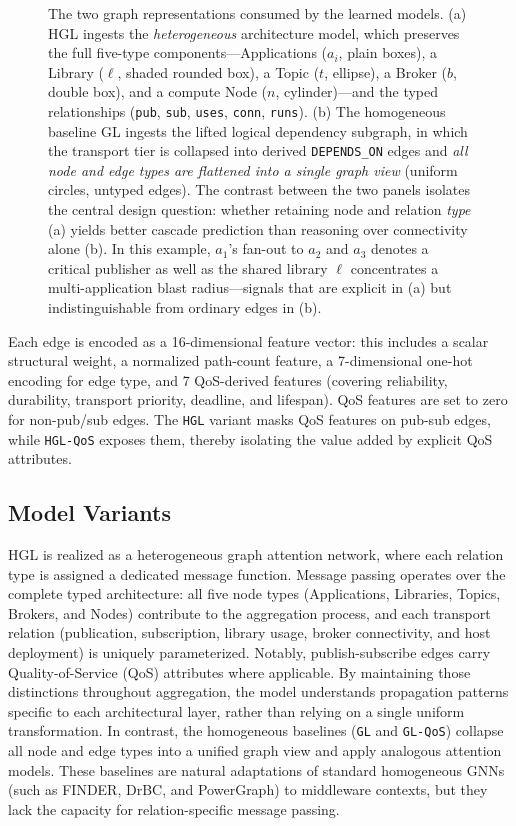 \documentclass[sigconf,9pt,anonymous]{acmart}
\begin{document}
\begin{figure}[t]
\caption{The two graph representations consumed by the learned models. (a) HGL ingests the \emph{heterogeneous} architecture model, which preserves the full five-type components---Applications ($a_i$, plain boxes), a Library ($\ell$, shaded rounded box), a Topic ($t$, ellipse), a Broker ($b$, double box), and a compute Node ($n$, cylinder)---and the typed relationships (\texttt{pub}, \texttt{sub}, \texttt{uses}, \texttt{conn}, \texttt{runs}). (b) The homogeneous baseline GL ingests the lifted logical dependency subgraph, in which the transport tier is collapsed into derived \texttt{DEPENDS\_ON} edges and \emph{all node and edge types are flattened into a single graph view} (uniform circles, untyped edges). The contrast between the two panels isolates the central design question: whether retaining node and relation \emph{type} (a) yields better cascade prediction than reasoning over connectivity alone (b). In this example, $a_1$'s fan-out to $a_2$ and $a_3$ denotes a critical publisher as well as the shared library $\ell$ concentrates a multi-application blast radius---signals that are explicit in (a) but indistinguishable from ordinary edges in (b).}
\label{fig:hetero-graph}
\end{figure}

Each edge is encoded as a 16-dimensional feature vector: this includes a scalar structural weight, a normalized path-count feature, a 7-dimensional one-hot encoding for edge type, and 7 QoS-derived features (covering reliability, durability, transport priority, deadline, and lifespan). QoS features are set to zero for non-pub/sub edges. The \texttt{HGL} variant masks QoS features on pub-sub edges, while \texttt{HGL-QoS} exposes them, thereby isolating the value added by explicit QoS attributes.

\subsection{Model Variants}

HGL is realized as a heterogeneous graph attention network, where each relation type is assigned a dedicated message function. Message passing operates over the complete typed architecture: all five node types (Applications, Libraries, Topics, Brokers, and Nodes) contribute to the aggregation process, and each transport relation (publication, subscription, library usage, broker connectivity, and host deployment) is uniquely parameterized. Notably, publish-subscribe edges carry Quality-of-Service (QoS) attributes where applicable. By maintaining those distinctions throughout aggregation, the model understands propagation patterns specific to each architectural layer, rather than relying on a single uniform transformation. In contrast, the homogeneous baselines (\texttt{GL} and \texttt{GL-QoS}) collapse all node and edge types into a unified graph view and apply analogous attention models. These baselines are natural adaptations of standard homogeneous GNNs (such as FINDER, DrBC, and PowerGraph) to middleware contexts, but they lack the capacity for relation-specific message passing.
\end{document}
